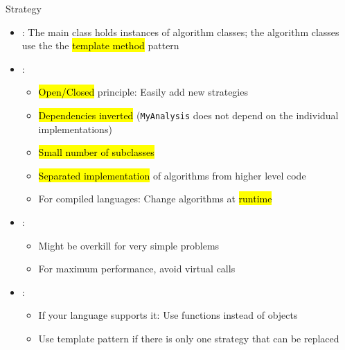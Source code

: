 \begin{frame}{Strategy}
	\begin{itemize}
		\item {}: The main class holds instances of algorithm classes; the algorithm classes use the the \hl{template method} pattern
		\item {}:
		\begin{itemize}
			\item \hl{Open/Closed} principle: Easily add new strategies
			\item \hl{Dependencies inverted} (\texttt{MyAnalysis} does not depend on the individual implementations)
			\item \hl{Small number of subclasses}
			\item \hl{Separated implementation} of algorithms from higher level code
			\item For compiled languages: Change algorithms at \hl{runtime}
		\end{itemize}
		\item {}: 
			\begin{itemize}
				\item Might be overkill for very simple problems
				\item For maximum performance, avoid virtual calls
			\end{itemize}
		\item {}:
		\begin{itemize}
			\item If your language supports it: Use functions instead of objects 
			\item Use template pattern if there is only one strategy that can be replaced
		\end{itemize}
	\end{itemize}
\end{frame}


